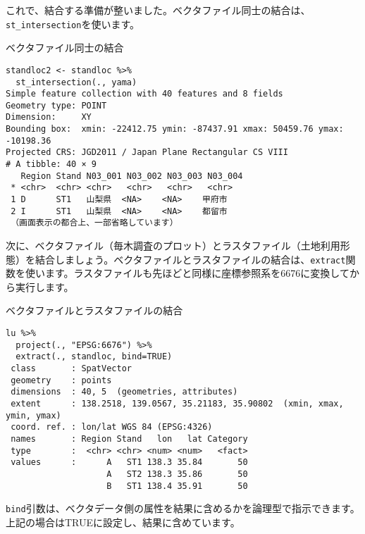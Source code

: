 これで、結合する準備が整いました。ベクタファイル同士の結合は、\verb|st_intersection|を使います。
\begin{itembox}[l]{ベクタファイル同士の結合}
\begin{verbatim}
standloc2 <- standloc %>%
  st_intersection(., yama)
Simple feature collection with 40 features and 8 fields
Geometry type: POINT
Dimension:     XY
Bounding box:  xmin: -22412.75 ymin: -87437.91 xmax: 50459.76 ymax: -10198.36
Projected CRS: JGD2011 / Japan Plane Rectangular CS VIII
# A tibble: 40 × 9
   Region Stand N03_001 N03_002 N03_003 N03_004
 * <chr>  <chr> <chr>   <chr>   <chr>   <chr>
 1 D      ST1   山梨県  <NA>    <NA>    甲府市
 2 I      ST1   山梨県  <NA>    <NA>    都留市
 （画面表示の都合上、一部省略しています）
\end{verbatim}
\end{itembox}

次に、ベクタファイル（毎木調査のプロット）とラスタファイル（土地利用形態）を結合しましょう。ベクタファイルとラスタファイルの結合は、\verb|extract|関数を使います。ラスタファイルも先ほどと同様に座標参照系を6676に変換してから実行します。
\begin{itembox}[l]{ベクタファイルとラスタファイルの結合}
\begin{verbatim}
lu %>%
  project(., "EPSG:6676") %>%
  extract(., standloc, bind=TRUE)
 class       : SpatVector 
 geometry    : points 
 dimensions  : 40, 5  (geometries, attributes)
 extent      : 138.2518, 139.0567, 35.21183, 35.90802  (xmin, xmax, ymin, ymax)
 coord. ref. : lon/lat WGS 84 (EPSG:4326) 
 names       : Region Stand   lon   lat Category
 type        :  <chr> <chr> <num> <num>   <fact>
 values      :      A   ST1 138.3 35.84       50
                    A   ST2 138.3 35.86       50
                    B   ST1 138.4 35.91       50
\end{verbatim}
\end{itembox}
\verb|bind|引数は、ベクタデータ側の属性を結果に含めるかを論理型で指示できます。上記の場合はTRUEに設定し、結果に含めています。


